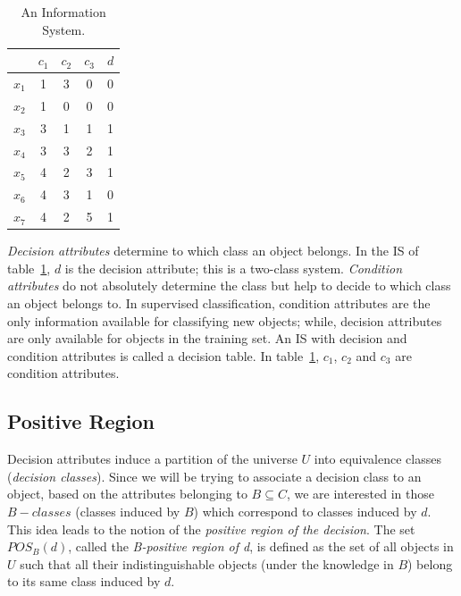 \documentclass[authoryear,11pt]{elsarticle}
\begin{document}
  
 \begin{table}[htb]
		\caption{An Information System.} \label{tab_IS}
		\centering
 	\begin{tabular}{c||c|c|c||c}
 			  & $c_1$ & $c_2$ &  $c_3$ & $d$ \\
 		\hline \hline
		$x_1$ &   1   &    3  &  0  &   0   \\
		$x_2$ &   1   &    0  &  0  &   0   \\
		$x_3$ &   3   &    1  &  1  &   1   \\
		$x_4$ &   3   &    3  &  2  &   1   \\
		$x_5$ &   4   &    2  &  3  &   1   \\
		$x_6$ &   4   &    3  &  1  &   0   \\
		$x_7$ &   4   &    2  &  5  &   1   \\
 	\end{tabular}             
 \end{table}
 
   
  \textit{Decision attributes} determine to which class an object belongs. In the IS of
  table~\ref{tab_IS}, $d$ is the decision attribute; this is a two-class system. \textit{Condition attributes} 
  do not absolutely determine the class but help to decide to which class an object belongs to. In supervised 
  classification, condition attributes are the only information available for classifying new objects; while, 
  decision attributes are only available for objects in the training set. An IS with decision and 
  condition attributes is called a decision table. In table~\ref{tab_IS}, $c_1$, $c_2$ and $c_3$ are condition 
  attributes.
  
\subsection{Positive Region}\label{subsect_Pos}
  Decision attributes induce a partition of the universe $U$ into equivalence classes 
  (\textit{decision classes}). Since we will be trying to associate a decision class to an object, 
  based on the attributes belonging to $B \subseteq C$, we are interested in those 
  $B-classes$ (classes induced by $B$) which correspond to classes induced by $d$. 
  This idea leads to the notion of the  \textit{positive region of the decision}. The set $POS_B(d)$, 
  called the \textit{B-positive region of d}, is defined as the set of all objects in $U$ such 
  that all their indistinguishable objects (under the knowledge in $B$) belong to its same class induced 
  by $d$.
  
\end{document}
